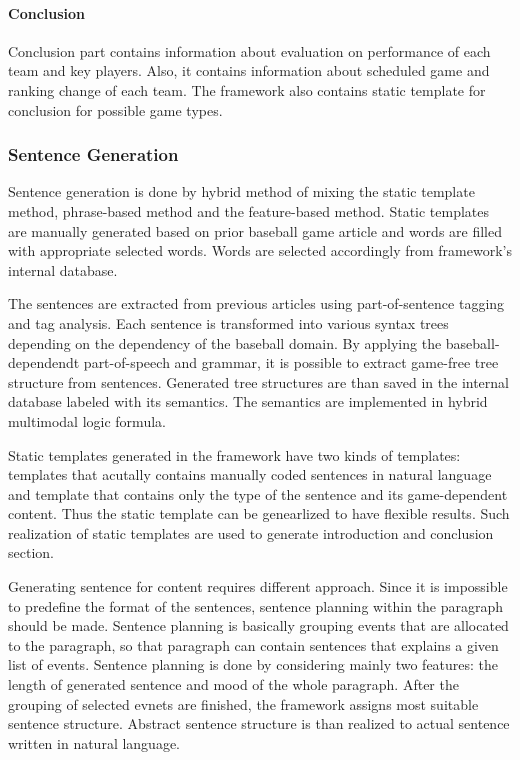 \documentclass[11pt,letterpaper]{article}
\begin{document}
\paragraph{Conclusion} 

Conclusion part contains information about evaluation on performance of each team and key players. Also, it contains information about scheduled game and ranking change of each team. The framework also contains static template for conclusion for possible game types. 

\subsubsection{Sentence Generation} 

Sentence generation is done by hybrid method of mixing the static template method, phrase-based method and the feature-based method. Static templates are manually generated based on prior baseball game article and words are filled with appropriate selected words. Words are selected accordingly from framework's internal database. 

The sentences are extracted from previous articles using part-of-sentence tagging and tag analysis. Each sentence is transformed into various syntax trees depending on the dependency of the baseball domain. By applying the baseball-dependendt part-of-speech and grammar, it is possible to extract game-free tree structure from sentences. Generated tree structures are than saved in the internal database labeled with its semantics. The semantics are implemented in hybrid multimodal logic formula. 

Static templates generated in the framework have two kinds of templates: templates that acutally contains manually coded sentences in natural language and template that contains only the type of the sentence and its game-dependent content. Thus the static template can be genearlized to have flexible results. Such realization of static templates are used to generate introduction and conclusion section. 

Generating sentence for content requires different approach. Since it is impossible to predefine the format of the sentences, sentence planning within the paragraph should be made. Sentence planning is basically grouping events that are allocated to the paragraph, so that paragraph can contain sentences that explains a given list of events. Sentence planning is done by considering mainly two features: the length of generated sentence and mood of the whole paragraph. After the grouping of selected evnets are finished, the framework assigns most suitable sentence structure. Abstract sentence structure is than realized to actual sentence written in natural language. 
\end{document}
